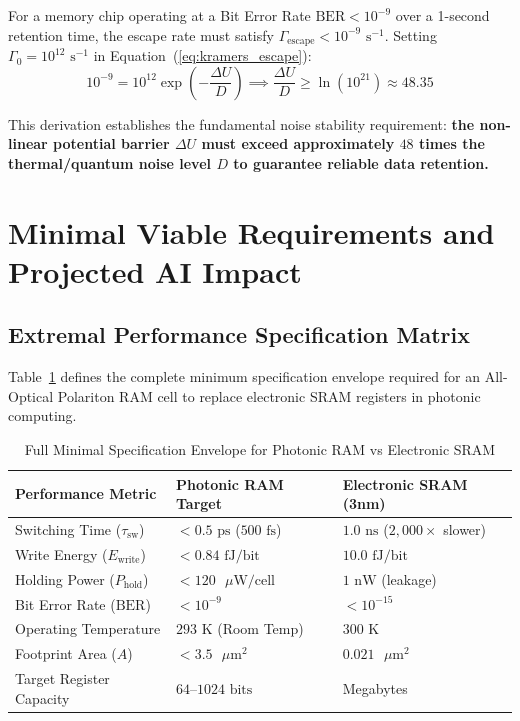 \documentclass[11pt,a4paper]{article}
\begin{document}
For a memory chip operating at a Bit Error Rate $\text{BER} < 10^{-9}$ over a 1-second retention time, the escape rate must satisfy $\Gamma_{\text{escape}} < 10^{-9}\text{ s}^{-1}$. Setting $\Gamma_0 = 10^{12}\text{ s}^{-1}$ in Equation~(\ref{eq:kramers_escape}):
\begin{equation}
10^{-9} = 10^{12} \exp\left( -\frac{\Delta U}{D} \right) \implies \frac{\Delta U}{D} \ge \ln(10^{21}) \approx 48.35
\end{equation}

This derivation establishes the fundamental noise stability requirement: \textbf{the non-linear potential barrier $\Delta U$ must exceed approximately $48$ times the thermal/quantum noise level $D$ to guarantee reliable data retention.}

\section{Minimal Viable Requirements and Projected AI Impact}

\subsection{Extremal Performance Specification Matrix}
Table~\ref{tab:specs_full} defines the complete minimum specification envelope required for an All-Optical Polariton RAM cell to replace electronic SRAM registers in photonic computing.

\begin{table}[h!]
\centering
\caption{Full Minimal Specification Envelope for Photonic RAM vs Electronic SRAM}
\label{tab:specs_full}
\small
\begin{tabular}{lll}
\toprule
\textbf{Performance Metric} & \textbf{Photonic RAM Target} & \textbf{Electronic SRAM (3nm)} \\
\midrule
Switching Time ($\tau_{\text{sw}}$) & $< 0.5\text{ ps}$ ($500\text{ fs}$) & $1.0\text{ ns}$ ($2,000\times$ slower) \\
Write Energy ($E_{\text{write}}$) & $< 0.84\text{ fJ/bit}$ & $10.0\text{ fJ/bit}$ \\
Holding Power ($P_{\text{hold}}$) & $< 120\text{ }\mu\text{W/cell}$ & $1\text{ nW}$ (leakage) \\
Bit Error Rate ($\text{BER}$) & $< 10^{-9}$ & $< 10^{-15}$ \\
Operating Temperature & $293\text{ K}$ (Room Temp) & $300\text{ K}$ \\
Footprint Area ($A$) & $< 3.5\text{ }\mu\text{m}^2$ & $0.021\text{ }\mu\text{m}^2$ \\
Target Register Capacity & $64\text{--}1024\text{ bits}$ & Megabytes \\
\bottomrule
\end{tabular}
\end{table}
\end{document}
